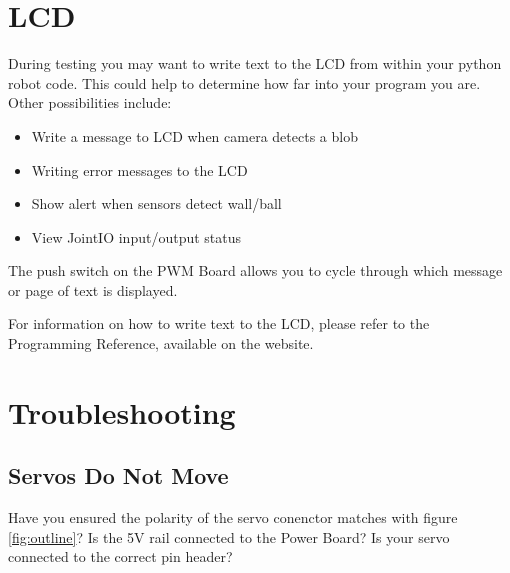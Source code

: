 \documentclass[a4paper, 12pt]{article}
\begin{document}
\section{LCD}
During testing you may want to write text to the LCD from within your python robot code. This could help to determine how far into your program you are. Other possibilities include:

\begin{itemize}
\item Write a message to LCD when camera detects a blob
\item Writing error messages to the LCD
\item Show alert when sensors detect wall/ball
\item View JointIO input/output status 
\end{itemize}

The push switch on the PWM Board allows you to cycle through which message or page of text is displayed. 
\vspace{12pt}

For information on how to write text to the LCD, please refer to the Programming Reference, available on the website.

\section{Troubleshooting}
\subsection{Servos Do Not Move}
Have you ensured the polarity of the servo conenctor matches with figure \ref{fig:outline}? Is the 5V rail connected to the Power Board? Is your servo connected to the correct pin header?
\end{document}
